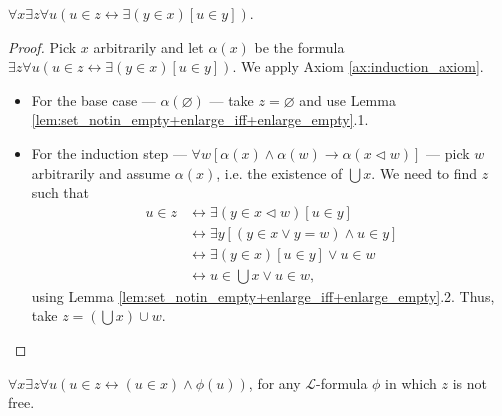\begin{theorem}
    \label{thm:exists_unionSet}
    \leanok
    $\forall x \exists z \forall u (u \in z \leftrightarrow \exists (y\in x)[u \in y])$.
\end{theorem}

\begin{proof}
    \leanok
    Pick $x$ arbitrarily and let $\alpha (x)$ be the formula $\exists z \forall u (u \in z \leftrightarrow \exists (y\in x)[u \in y])$.
    We apply Axiom \ref{ax:induction_axiom}.
    \begin{itemize}
        \item For the base case — $\alpha (\varnothing)$ — take $z=\varnothing$ and use Lemma \ref{lem:set_notin_empty+enlarge_iff+enlarge_empty}.1.
        \item For the induction step — $\forall w[\alpha(x) \land \alpha(w) \rightarrow \alpha(x \lhd w)]$ — 
        pick $w$ arbitrarily and assume $\alpha(x)$, i.e. the existence of $\bigcup x$.
        We need to find $z$ such that
        \begin{equation*}
        \begin{split}
            u \in z & \leftrightarrow \exists (y \in x \lhd w)[u \in y]\\
            & \leftrightarrow \exists y[(y \in x \lor y = w) \land u \in y]\\
            & \leftrightarrow \exists(y \in x)[u \in y] \lor u \in w\\
            & \leftrightarrow u \in \bigcup x \lor u \in w,
        \end{split}
        \end{equation*}
        using Lemma \ref{lem:set_notin_empty+enlarge_iff+enlarge_empty}.2. Thus, take $z = (\bigcup x) \cup w$.
    \end{itemize}
\end{proof}

\begin{theorem}
    \label{thm:comp_scheme}
    \leanok
    $\forall x \exists z \forall u (u\in z \leftrightarrow (u \in x) \land \phi (u))$, for any $\mathcal{L}$-formula $\phi$ in which $z$ is not free.
\end{theorem}

